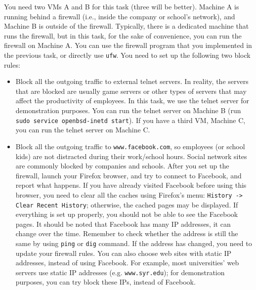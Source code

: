 You need two VMs A and B for this task (three will be better). Machine A is running 
behind a firewall (i.e., inside the company or school's network), and Machine B 
is outside of the firewall.
Typically, there is a dedicated machine that runs the firewall, but
in this task, for the sake of convenience, you can run the firewall 
on Machine A.
You can use the firewall program that you implemented in the previous task,
or directly use {\tt ufw}.
You need to set up the following two block rules:
\begin{itemize}

\item Block all the outgoing traffic to external telnet servers.  In
reality, the servers that are blocked are usually game servers or other
types of servers that may affect the productivity of employees. In this 
task, we use the telnet server for demonstration purposes. You can run
the telnet server on Machine B (run {\tt sudo service openbsd-inetd
start}). If you have a third VM, Machine C, you can run the 
telnet server on Machine C. 

\item Block all the outgoing traffic to {\tt www.facebook.com}, so employees 
(or school kids) are not distracted during their work/school hours. Social
network sites are commonly blocked by companies and schools. After 
you set up the firewall, launch your Firefox browser, and try to connect to Facebook, and report
what happens. If you have already visited Facebook before using this 
browser, you need to clear all the caches using 
Firefox's menu: {\tt History -> Clear Recent History}; otherwise, the cached
pages may be displayed. If everything is set up properly, you 
should not be able to see the Facebook pages. 
It should be noted that Facebook has many IP addresses, it can 
change over the time. Remember to check whether the address is 
still the same by using {\tt ping} or {\tt dig} command. If 
the address has changed, you need to update your firewall rules. 
You can also choose web sites with static IP addresses, instead of using Facebook.
For example, most universities' web servers use static IP addresses (e.g. 
{\tt www.syr.edu}); for demonstration purposes, 
you can try block these IPs, instead of Facebook. 

\end{itemize}


